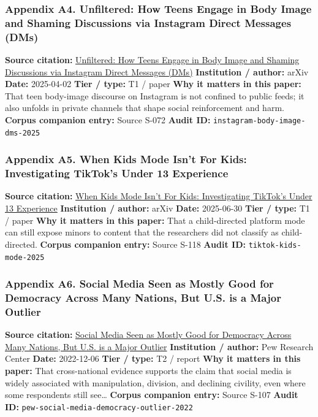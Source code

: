 \documentclass[
  american,
  11pt,
  letterpaper,
]{article}
\begin{document}
\subsubsection{Appendix A4. Unfiltered: How Teens Engage in Body Image
and Shaming Discussions via Instagram Direct Messages
(DMs)}\label{appendix-a4-unfiltered-how-teens-engage-in-body-image-and-shaming-discussions-via-instagram-direct-messages-dms}

\textbf{Source citation:}
\href{https://arxiv.org/abs/2504.02176}{Unfiltered: How Teens Engage in
Body Image and Shaming Discussions via Instagram Direct Messages (DMs)}
\textbf{Institution / author:} arXiv \textbf{Date:} 2025-04-02
\textbf{Tier / type:} T1 / paper \textbf{Why it matters in this paper:}
That teen body-image discourse on Instagram is not confined to public
feeds; it also unfolds in private channels that shape social
reinforcement and harm. \textbf{Corpus companion entry:} Source S-072
\textbf{Audit ID:} \texttt{instagram-body-image-dms-2025}

\subsubsection{Appendix A5. When Kids Mode Isn't For Kids: Investigating
TikTok's Under 13
Experience}\label{appendix-a5-when-kids-mode-isn-t-for-kids-investigating-tiktok-s-under-13-experience}

\textbf{Source citation:} \href{https://arxiv.org/abs/2507.00299}{When
Kids Mode Isn't For Kids: Investigating TikTok's Under 13 Experience}
\textbf{Institution / author:} arXiv \textbf{Date:} 2025-06-30
\textbf{Tier / type:} T1 / paper \textbf{Why it matters in this paper:}
That a child-directed platform mode can still expose minors to content
that the researchers did not classify as child-directed. \textbf{Corpus
companion entry:} Source S-118 \textbf{Audit ID:}
\texttt{tiktok-kids-mode-2025}

\subsubsection{Appendix A6. Social Media Seen as Mostly Good for
Democracy Across Many Nations, But U.S. is a Major
Outlier}\label{appendix-a6-social-media-seen-as-mostly-good-for-democracy-across-many-nations-but-u-s-is-a-major-outlier}

\textbf{Source citation:}
\href{https://www.pewresearch.org/global/2022/12/06/social-media-seen-as-mostly-good-for-democracy-across-many-nations-but-u-s-is-a-major-outlier/}{Social
Media Seen as Mostly Good for Democracy Across Many Nations, But U.S. is
a Major Outlier} \textbf{Institution / author:} Pew Research Center
\textbf{Date:} 2022-12-06 \textbf{Tier / type:} T2 / report \textbf{Why
it matters in this paper:} That cross-national evidence supports the
claim that social media is widely associated with manipulation,
division, and declining civility, even where some respondents still
see\ldots{} \textbf{Corpus companion entry:} Source S-107 \textbf{Audit
ID:} \texttt{pew-social-media-democracy-outlier-2022}
\end{document}
